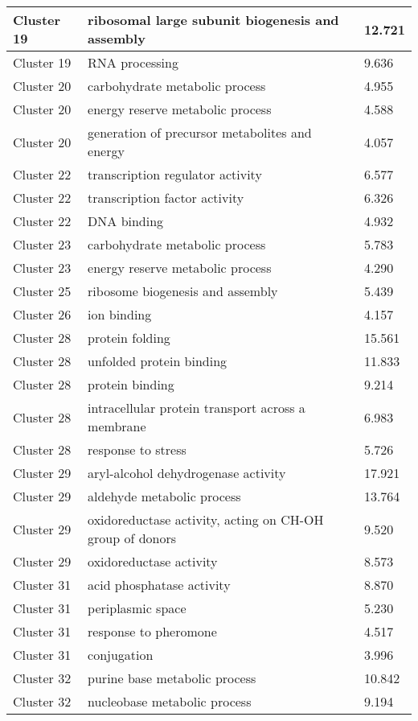 {\begin{longtable}{|p{1in}|p{4in}|p{1in}|}
Cluster 19 & ribosomal large subunit biogenesis and assembly & 12.721 \\ \hline
Cluster 19 & RNA processing & 9.636 \\ \hline
Cluster 20 & carbohydrate metabolic process & 4.955 \\ \hline
Cluster 20 & energy reserve metabolic process & 4.588 \\ \hline
Cluster 20 & generation of precursor metabolites and energy & 4.057 \\ \hline
Cluster 22 & transcription regulator activity & 6.577 \\ \hline
Cluster 22 & transcription factor activity & 6.326 \\ \hline
Cluster 22 & DNA binding & 4.932 \\ \hline
Cluster 23 & carbohydrate metabolic process & 5.783 \\ \hline
Cluster 23 & energy reserve metabolic process & 4.290 \\ \hline
Cluster 25 & ribosome biogenesis and assembly & 5.439 \\ \hline
Cluster 26 & ion binding & 4.157 \\ \hline
Cluster 28 & protein folding & 15.561 \\ \hline
Cluster 28 & unfolded protein binding & 11.833 \\ \hline
Cluster 28 & protein binding & 9.214 \\ \hline
Cluster 28 & intracellular protein transport across a membrane & 6.983 \\ \hline
Cluster 28 & response to stress & 5.726 \\ \hline
Cluster 29 & aryl-alcohol dehydrogenase activity & 17.921 \\ \hline
Cluster 29 & aldehyde metabolic process & 13.764 \\ \hline
Cluster 29 & oxidoreductase activity, acting on CH-OH group of donors & 9.520 \\ \hline
Cluster 29 & oxidoreductase activity & 8.573 \\ \hline
Cluster 31 & acid phosphatase activity & 8.870 \\ \hline
Cluster 31 & periplasmic space & 5.230 \\ \hline
Cluster 31 & response to pheromone & 4.517 \\ \hline
Cluster 31 & conjugation & 3.996 \\ \hline
Cluster 32 & purine base metabolic process & 10.842 \\ \hline
Cluster 32 & nucleobase metabolic process & 9.194 \\ \hline

\end{longtable}}
